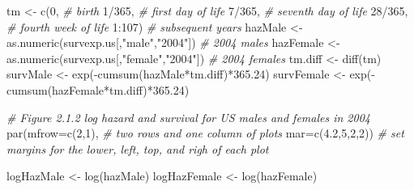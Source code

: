 \documentclass[
]{book}
\newenvironment{Shaded}{\begin{snugshade}}{\end{snugshade}}
\newcommand{\AttributeTok}[1]{\textcolor[rgb]{0.77,0.63,0.00}{#1}}
\newcommand{\CommentTok}[1]{\textcolor[rgb]{0.56,0.35,0.01}{\textit{#1}}}
\newcommand{\DecValTok}[1]{\textcolor[rgb]{0.00,0.00,0.81}{#1}}
\newcommand{\FloatTok}[1]{\textcolor[rgb]{0.00,0.00,0.81}{#1}}
\newcommand{\FunctionTok}[1]{\textcolor[rgb]{0.00,0.00,0.00}{#1}}
\newcommand{\NormalTok}[1]{#1}
\newcommand{\OtherTok}[1]{\textcolor[rgb]{0.56,0.35,0.01}{#1}}
\newcommand{\SpecialCharTok}[1]{\textcolor[rgb]{0.00,0.00,0.00}{#1}}
\newcommand{\StringTok}[1]{\textcolor[rgb]{0.31,0.60,0.02}{#1}}
\theoremstyle{definition}
\theoremstyle{definition}
\theoremstyle{definition}
\theoremstyle{definition}
\theoremstyle{remark}
\begin{document}
\begin{Shaded}
\begin{Highlighting}[]
\NormalTok{tm }\OtherTok{\textless{}{-}} \FunctionTok{c}\NormalTok{(}\DecValTok{0}\NormalTok{, }\CommentTok{\# birth}
   \DecValTok{1}\SpecialCharTok{/}\DecValTok{365}\NormalTok{, }\CommentTok{\# first day of life}
   \DecValTok{7}\SpecialCharTok{/}\DecValTok{365}\NormalTok{, }\CommentTok{\# seventh day of life}
   \DecValTok{28}\SpecialCharTok{/}\DecValTok{365}\NormalTok{, }\CommentTok{\# fourth week of life}
   \DecValTok{1}\SpecialCharTok{:}\DecValTok{107}\NormalTok{) }\CommentTok{\# subsequent years}
\NormalTok{hazMale }\OtherTok{\textless{}{-}} \FunctionTok{as.numeric}\NormalTok{(survexp.us[,}\StringTok{"male"}\NormalTok{,}\StringTok{"2004"}\NormalTok{]) }\CommentTok{\# 2004 males}
\NormalTok{hazFemale }\OtherTok{\textless{}{-}} \FunctionTok{as.numeric}\NormalTok{(survexp.us[,}\StringTok{"female"}\NormalTok{,}\StringTok{"2004"}\NormalTok{]) }\CommentTok{\# 2004 females}
\NormalTok{tm.diff }\OtherTok{\textless{}{-}} \FunctionTok{diff}\NormalTok{(tm)}
\NormalTok{survMale }\OtherTok{\textless{}{-}} \FunctionTok{exp}\NormalTok{(}\SpecialCharTok{{-}}\FunctionTok{cumsum}\NormalTok{(hazMale}\SpecialCharTok{*}\NormalTok{tm.diff)}\SpecialCharTok{*}\FloatTok{365.24}\NormalTok{)}
\NormalTok{survFemale }\OtherTok{\textless{}{-}} \FunctionTok{exp}\NormalTok{(}\SpecialCharTok{{-}}\FunctionTok{cumsum}\NormalTok{(hazFemale}\SpecialCharTok{*}\NormalTok{tm.diff)}\SpecialCharTok{*}\FloatTok{365.24}\NormalTok{)}

\CommentTok{\# Figure 2.1.2 log hazard and survival for US males and females in 2004}
\FunctionTok{par}\NormalTok{(}\AttributeTok{mfrow=}\FunctionTok{c}\NormalTok{(}\DecValTok{2}\NormalTok{,}\DecValTok{1}\NormalTok{),    }\CommentTok{\# two rows and one column of plots}
    \AttributeTok{mar=}\FunctionTok{c}\NormalTok{(}\FloatTok{4.2}\NormalTok{,}\DecValTok{5}\NormalTok{,}\DecValTok{2}\NormalTok{,}\DecValTok{2}\NormalTok{))  }\CommentTok{\# set margins for the lower, left, top, and righ of each plot}

\NormalTok{logHazMale }\OtherTok{\textless{}{-}} \FunctionTok{log}\NormalTok{(hazMale)}
\NormalTok{logHazFemale }\OtherTok{\textless{}{-}} \FunctionTok{log}\NormalTok{(hazFemale)    }


\end{Highlighting}
\end{Shaded}
\end{document}
